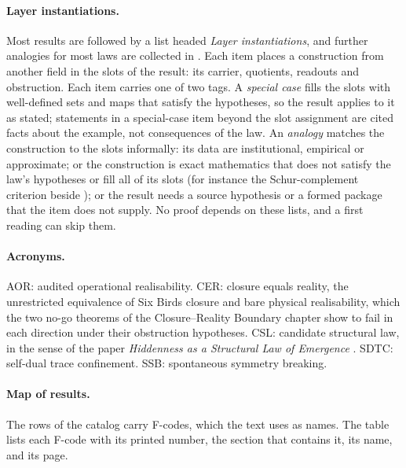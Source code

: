 \paragraph{Layer instantiations.}
Most results are followed by a list headed \emph{Layer
instantiations}, and further analogies for most laws are collected in
.  Each item places a construction
from another field in the slots of the result: its carrier, quotients,
readouts and obstruction.  Each item carries one of two tags.  A
\emph{special case} fills the slots with well-defined sets and maps that
satisfy the hypotheses, so the result applies to it as stated;
statements in a special-case item beyond the slot assignment are cited
facts about the example, not consequences of the law.  An
\emph{analogy} matches the construction to the slots informally: its
data are institutional, empirical or approximate; or the construction
is exact mathematics that does not satisfy the law's hypotheses or fill
all of its slots (for instance the Schur-complement criterion beside
); or the result needs a source hypothesis or a formed
package that the item does not supply.  No proof depends on these lists,
and a first reading can skip them.

\paragraph{Acronyms.}
AOR: audited operational realisability.
CER: closure equals reality, the unrestricted equivalence of Six Birds
closure and bare physical realisability, which the two no-go theorems
of the Closure--Reality Boundary chapter show to fail in each direction
under their obstruction hypotheses.
CSL: candidate structural law, in the sense of the paper
\emph{Hiddenness as a Structural Law of Emergence}
\citep{Tsiokos2026CSL}.
SDTC: self-dual trace confinement.
SSB: spontaneous symmetry breaking.

\paragraph{Map of results.}
The rows of the catalog carry F-codes, which the text uses as names.
The table lists each F-code with its printed number, the section that
contains it, its name, and its page.

